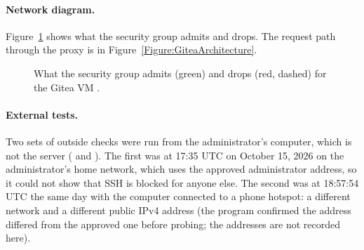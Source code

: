 \paragraph{Network diagram.}
Figure~\ref{Figure:GiteaFirewall} shows what the security group admits and
drops. The request path through the proxy is in
Figure~\ref{Figure:GiteaArchitecture}.

\begin{figure}[htbp]
\centering
\resizebox{\linewidth}{!}{}
\caption{What the security group admits (green) and drops (red, dashed) for the Gitea VM
\cite{DosManual,DockerFirewall}.}
\label{Figure:GiteaFirewall}
\end{figure}

\paragraph{External tests.}
Two sets of outside checks were run from the administrator's computer, which is
not the server ( and ). The first was at 17:35 UTC on October
15, 2026 on the administrator's home network, which uses the approved
administrator address, so it could not show that SSH is blocked for anyone else.
The second was at 18:57:54 UTC the same day with the computer connected to a
phone hotspot: a different network and a different public IPv4 address (the
program confirmed the address differed from the approved one before probing; the
addresses are not recorded here).


